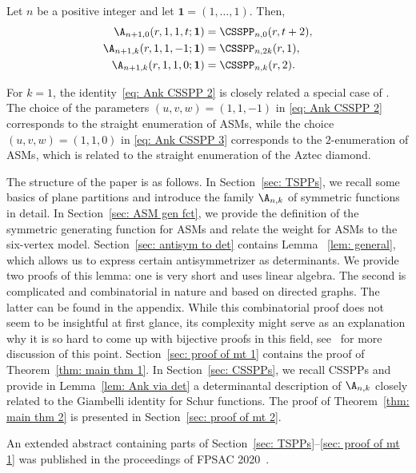 \begin{thm}
\label{thm: main thm 2}
Let $n$ be a positive integer and let $\mathbf{1}=(1, \ldots, 1)$. Then,
\begin{align}
\label{eq: Ank CSSPP 1}
\A_{n+1,0}(r,1,1,t;\mathbf{1})&=\CSSPP_{n,0}(r,t+2),\\
\label{eq: Ank CSSPP 2}
\A_{n+1,k}(r,1,1,-1;\mathbf{1})&=\CSSPP_{n,2k}(r,1),\\
\label{eq: Ank CSSPP 3}
\A_{n+1,k}(r,1,1,0;\mathbf{1})&=\CSSPP_{n,k}(r,2).
\end{align}
\end{thm}
For $k=1$, the identity~\eqref{eq: Ank CSSPP 2} is closely related a special case of \cite[Theorem 2.6]{FischerSchreierAigner23}. The choice of the parameters $(u,v,w)=(1,1,-1)$ in 
\eqref{eq: Ank CSSPP 2} corresponds to the straight enumeration of ASMs, while the choice $(u,v,w)=(1,1,0)$ in 
\eqref{eq: Ank CSSPP 3} corresponds to the $2$-enumeration of ASMs, which is related to the straight enumeration of the Aztec diamond.

The structure of the paper is as follows. In Section~\ref{sec: TSPPs}, we  recall some basics of plane partitions and introduce the family $\A_{n,k}$ of symmetric functions in detail. In Section~\ref{sec: ASM gen fct}, we provide the definition of the symmetric generating function for ASMs and relate the weight for ASMs to the six-vertex model. Section~\ref{sec: antisym to det} contains Lemma ~\ref{lem: general}, which allows us to express certain antisymmetrizer as determinants. We provide two proofs of this lemma: one is very short and uses linear algebra. The second is complicated and combinatorial in nature and based on directed graphs. The latter can be found in the appendix. While this combinatorial proof does not seem to be insightful at first glance, its complexity might serve as an explanation why it is so hard to come up with bijective proofs in this field, see~\cite{cube} for more discussion of this point. Section~\ref{sec: proof of mt 1} contains the proof of Theorem~\ref{thm: main thm 1}. In Section~\ref{sec: CSSPPs}, we recall CSSPPs and provide in Lemma~\ref{lem: Ank via det} a determinantal description of $\A_{n,k}$ closely related to the Giambelli identity for Schur functions. The proof of Theorem~\ref{thm: main thm 2} is presented in Section~\ref{sec: proof of mt 2}.

An extended abstract containing parts of Section~\ref{sec: TSPPs}--\ref{sec: proof of mt 1} was published in the proceedings of FPSAC 2020~\cite{AignerFischerKonvalinkaNadeauTewari20}.

